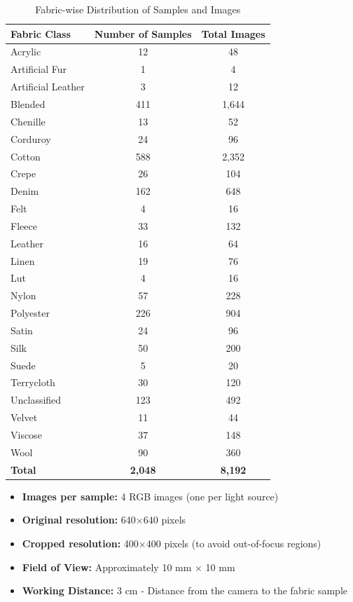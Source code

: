 \begin{table}[H]
\centering
\caption{Fabric-wise Distribution of Samples and Images}
\label{tab:fabric_distribution}
\begin{tabular}{|l|c|c|}
\hline
\textbf{Fabric Class} & \textbf{Number of Samples} & \textbf{Total Images} \\
\hline
Acrylic & 12 & 48 \\
Artificial Fur & 1 & 4 \\
Artificial Leather & 3 & 12 \\
Blended & 411 & 1,644 \\
Chenille & 13 & 52 \\
Corduroy & 24 & 96 \\
Cotton & 588 & 2,352 \\
Crepe & 26 & 104 \\
Denim & 162 & 648 \\
Felt & 4 & 16 \\
Fleece & 33 & 132 \\
Leather & 16 & 64 \\
Linen & 19 & 76 \\
Lut & 4 & 16 \\
Nylon & 57 & 228 \\
Polyester & 226 & 904 \\
Satin & 24 & 96 \\
Silk & 50 & 200 \\
Suede & 5 & 20 \\
Terrycloth & 30 & 120 \\
Unclassified & 123 & 492 \\
Velvet & 11 & 44 \\
Viscose & 37 & 148 \\
Wool & 90 & 360 \\
\hline
\textbf{Total} & \textbf{2,048} & \textbf{8,192} \\
\hline
\end{tabular}
\end{table}


\begin{itemize}[noitemsep, topsep=0pt]
    \item \textbf{Images per sample:} 4 RGB images (one per light source)
    \item \textbf{Original resolution:} 640$\times$640 pixels
    \item \textbf{Cropped resolution:} 400$\times$400 pixels (to avoid out-of-focus regions)
    \item \textbf{Field of View:} Approximately 10 mm $\times$ 10 mm
    \item \textbf{Working Distance:} 3 cm - Distance from the camera to the fabric sample
\end{itemize}

